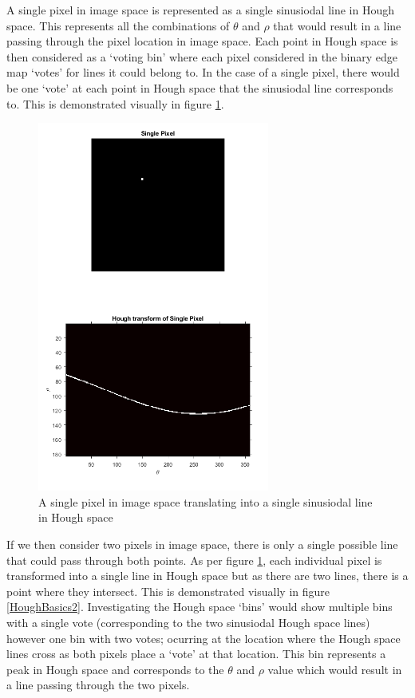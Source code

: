 \documentclass{article}
\begin{document}
	
	A single pixel in image space is represented as a single sinusiodal line in Hough space. This represents all the combinations of $\theta$ and $\rho$ that would result in a line passing through the pixel location in image space. Each point in Hough space is then considered as a `voting bin' where each pixel considered in the binary edge map `votes' for lines it could belong to. In the case of a single pixel, there would be one `vote' at each point in Hough space that the sinusiodal line corresponds to. This is demonstrated visually in figure \ref{HoughBasics}.
	
	\begin{figure}
		\centering
		\includegraphics[width=3.0in]{HoughBasics}
		\caption{A single pixel in image space translating into a single sinusiodal line in Hough space}
		\label{HoughBasics}
	\end{figure}
	
	
	If we then consider two pixels in image space, there is only a single possible line that could pass through both points. As per figure \ref{HoughBasics}, each individual pixel is transformed into a single line in Hough space but as there are two lines, there is a point where they intersect. This is demonstrated visually in figure \ref{HoughBasics2}. Investigating the Hough space `bins' would show multiple bins with a single vote (corresponding to the two sinusiodal Hough space lines) however one bin with two votes; ocurring at the location where the Hough space lines cross as both pixels place a `vote' at that location. This bin represents a peak in Hough space and corresponds to the $\theta$ and $\rho$ value which would result in a line passing through the two pixels.
	
\end{document}
